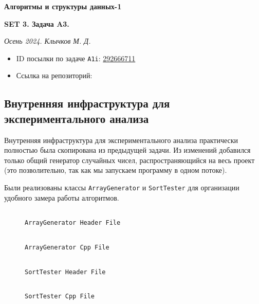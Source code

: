 \documentclass[11pt,a4paper]{scrarticle}
\author{Клычков Максим Дмитриевич}
\theoremstyle{definition}
\begin{document}
\centerline{\textbf{\huge Алгоритмы и структуры данных-1}}
\centerline{\textbf{SET 3. Задача A3.}}
\begin{flushright}
	\emph{Осень 2024. Клычков М. Д.}
\end{flushright}

\begin{itemize}
	\item ID посылки по задаче \texttt{A1i}: \href{https://dsahse.contest.codeforces.com/group/NOflOR1Qt0/contest/565612/submission/292666711}{292666711}
	\item Ссылка на репозиторий:
\end{itemize}

\subsection*{Внутренняя инфраструктура для экспериментального анализа}

Внутренняя инфраструктура для экспериментального анализа практически полностью была скопирована из предыдущей задачи. Из изменений добавился только общий генератор случайных чисел, распространяющийся на весь проект (это позволительно, так как мы запускаем программу в одном потоке).

Были реализованы классы \texttt{ArrayGenerator} и \texttt{SortTester} для организации удобного замера работы алгоритмов.

\begin{figure}[htp]
	\centering
	\inputminted[linenos,fontsize=\small]{cpp}{../analyze/generator.h}
	\caption{\texttt{ArrayGenerator Header File}}
	\label{code:generator-h}
\end{figure}
\FloatBarrier

\begin{figure}[htp]
	\centering
	\inputminted[linenos,fontsize=\small]{cpp}{../analyze/generator.cpp}
	\caption{\texttt{ArrayGenerator Cpp File}}
	\label{code:generator-cpp}
\end{figure}
\FloatBarrier

\begin{figure}[htp]
	\centering
	\inputminted[linenos,fontsize=\small]{cpp}{../analyze/tester.h}
	\caption{\texttt{SortTester Header File}}
	\label{code:tester-h}
\end{figure}
\FloatBarrier

\begin{figure}[htp]
	\centering
	\inputminted[linenos,fontsize=\small]{cpp}{../analyze/tester.cpp}
	\caption{\texttt{SortTester Cpp File}}
	\label{code:tester-cpp}
\end{figure}
\FloatBarrier
\end{document}
